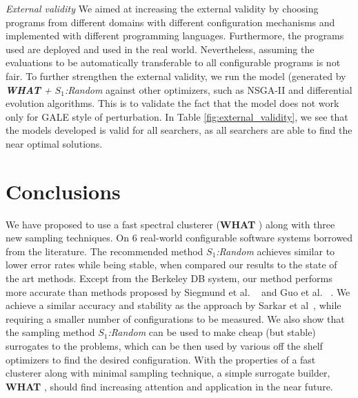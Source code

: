 \documentclass{sig-alternative}
\newcommand{\what}{{\bf WHAT }}
\begin{document}
{\em External validity}  We aimed at increasing the external validity by choosing programs from different domains with different configuration mechanisms and implemented with different programming languages. Furthermore, the programs used are deployed and used in the real world. Nevertheless, assuming the evaluations to be automatically transferable  to all configurable programs is not fair. To further strengthen the external validity, we run the model (generated by \textit{\what + $S_1$:Random} against other optimizers, such as NSGA-II and differential evolution algorithms\cite{storn1997differential}. This is to validate the fact that the model does not work only for GALE style of perturbation. In Table \ref{fig:external_validity}, we see that the models developed is valid for all searchers, as all searchers are able to find the near optimal solutions.







\section{Conclusions}

We have proposed to use a fast spectral clusterer (\what) along with three new sampling techniques. On 6 real-world configurable software systems borrowed from the literature. The recommended method \textit{$S_1$:Random} achieves similar to lower error rates while being stable, when compared our results to the state of the art methods. 
Except from the Berkeley DB system, our method performs more accurate than methods proposed by Siegmund et al.  ~\cite{siegmund2012predicting} and Guo et al. ~\cite{guo2013variability}. We achieve a similar accuracy and stability as the approach by Sarkar et al~\cite{}, while requiring a smaller number of configurations to be measured. We also show that the sampling method \textit{$S_1$:Random} can be used to make cheap (but stable) surrogates to the problems, which can be then used by various off the shelf optimizers to find the desired configuration. 
With the properties of  a fast clusterer along with minimal sampling technique, a simple surrogate builder, \what, should find increasing attention and application in the near future.



\vspace*{0.5mm}
 
 


\balance
  
\end{document}
